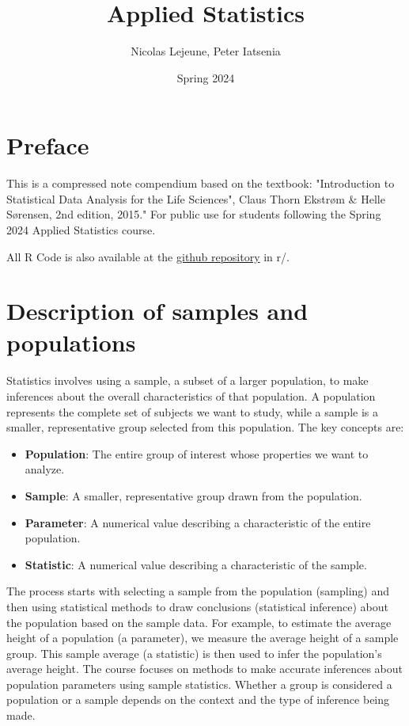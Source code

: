 \documentclass{article}
\title{Applied Statistics}
\author{Nicolas Lejeune, Peter Iatsenia}
\date{Spring 2024}
\begin{document}
\maketitle

\tableofcontents

\pagebreak

\section*{Preface}
This is a compressed note compendium based on the textbook: "Introduction to Statistical Data Analysis for the Life Sciences", Claus Thorn Ekstrøm \& Helle Sørensen, 2nd edition, 2015." For public use for students following the Spring 2024 Applied Statistics course.

All R Code is also available at the \href{https://github.com/palpatine/applied-statistics-2024}{github repository} in r/.

\section{Description of samples and populations}

\paragraph{}
Statistics involves using a sample, a subset of a larger population, to make inferences about the overall characteristics of that population. A population represents the complete set of subjects we want to study, while a sample is a smaller, representative group selected from this population. The key concepts are:

\begin{itemize}
    \item \textbf{Population}: The entire group of interest whose properties we want to analyze.
    \item \textbf{Sample}: A smaller, representative group drawn from the population.
    \item \textbf{Parameter}: A numerical value describing a characteristic of the entire population.
    \item \textbf{Statistic}: A numerical value describing a characteristic of the sample.
\end{itemize}

The process starts with selecting a sample from the population (sampling) and then using statistical methods to draw conclusions (statistical inference) about the population based on the sample data. For example, to estimate the average height of a population (a parameter), we measure the average height of a sample group. This sample average (a statistic) is then used to infer the population's average height. The course focuses on methods to make accurate inferences about population parameters using sample statistics. Whether a group is considered a population or a sample depends on the context and the type of inference being made.
\end{document}
